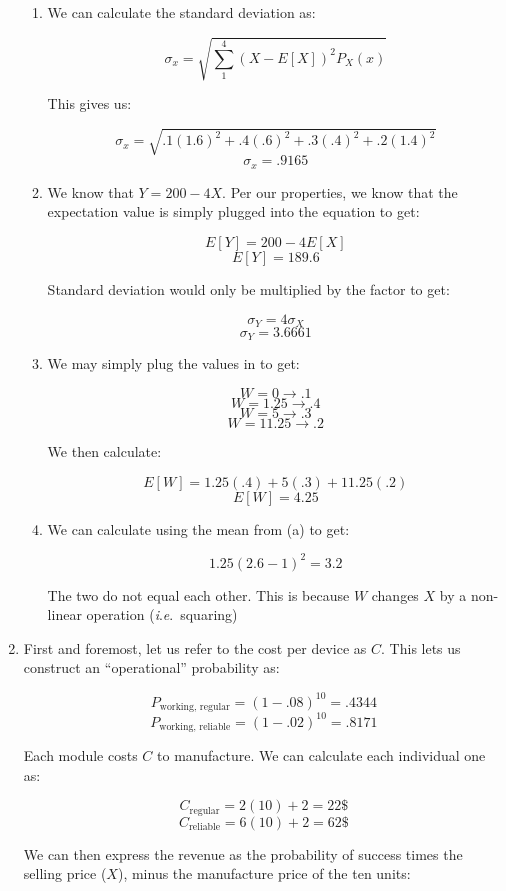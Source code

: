 \begin{enumerate}
\begin{enumerate}
      \item We can calculate the standard deviation as:

        $$\sigma_x=\sqrt{\sum_1^4 (X-E[X])^2P_X(x)}$$

        This gives us:

        $$\sigma_x=\sqrt{.1(1.6)^2+.4(.6)^2+.3(.4)^2+.2(1.4)^2}$$
        $$\boxed{\sigma_x=.9165}$$

      \item We know that $Y=200-4X$. Per our properties, we know that the expectation value is simply plugged into the equation to get:

        $$E[Y]=200-4E[X]$$
        $$\boxed{E[Y]=189.6}$$

        Standard deviation would only be multiplied by the factor to get:

        $$\sigma_Y=4\sigma_X$$
        $$\boxed{\sigma_Y=3.6661}$$

      \item We may simply plug the values in to get:

        $$W=0\to .1$$
        $$W=1.25\to .4$$
        $$W=5\to .3$$
        $$W=11.25\to .2$$

        We then calculate:

        $$E[W]=1.25(.4)+5(.3)+11.25(.2)$$
        $$\boxed{E[W]=4.25}$$

      \item We can calculate using the mean from (a) to get:

        $$1.25(2.6-1)^2=3.2$$

        The two do not equal each other. This is because $W$ changes $X$ by a non-linear operation (\textit{i}.\textit{e}.\ squaring)

    \end{enumerate}

  \item First and foremost, let us refer to the cost per device as $C$. This lets us construct an ``operational'' probability as:

    $$P_{\text{working, regular}}=(1-.08)^{10}=.4344$$
    $$P_{\text{working, reliable}}=(1-.02)^{10}=.8171$$

    Each module costs $C$ to manufacture. We can calculate each individual one as:

    $$C_{\text{regular}}=2(10)+2=22\$$$
    $$C_{\text{reliable}}=6(10)+2=62\$$$

    We can then express the revenue as the probability of success times the selling price ($X$), minus the manufacture price of the ten units:


\end{enumerate}
